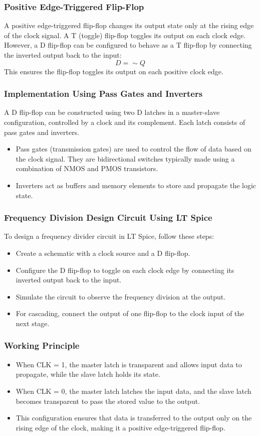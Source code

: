 \subsubsection*{Positive Edge-Triggered Flip-Flop}
A positive edge-triggered flip-flop changes its output state only at the rising edge of the clock signal. A T (toggle) flip-flop toggles its output on each clock edge. However, a D flip-flop can be configured to behave as a T flip-flop by connecting the inverted output back to the input:
\[
D = \sim Q
\]
This ensures the flip-flop toggles its output on each positive clock edge.
\subsubsection*{Implementation Using Pass Gates and Inverters}
A D flip-flop can be constructed using two D latches in a master-slave configuration, controlled by a clock and its complement. Each latch consists of pass gates and inverters.
\begin{itemize}
    \item Pass gates (transmission gates) are used to control the flow of data based on the clock signal. They are bidirectional switches typically made using a combination of NMOS and PMOS transistors.
    \item Inverters act as buffers and memory elements to store and propagate the logic state.
\end{itemize}
\subsubsection*{Frequency Division Design Circuit Using LT Spice}
To design a frequency divider circuit in LT Spice, follow these steps:
\begin{itemize}
    \item Create a schematic with a clock source and a D flip-flop.
    \item Configure the D flip-flop to toggle on each clock edge by connecting its inverted output back to the input.
    \item Simulate the circuit to observe the frequency division at the output.
    \item For cascading, connect the output of one flip-flop to the clock input of the next stage.
\end{itemize}
\subsubsection*{Working Principle}
\begin{itemize}
    \item When CLK = 1, the master latch is transparent and allows input data to propagate, while the slave latch holds its state.
    \item When CLK = 0, the master latch latches the input data, and the slave latch becomes transparent to pass the stored value to the output.
    \item This configuration ensures that data is transferred to the output only on the rising edge of the clock, making it a positive edge-triggered flip-flop.
\end{itemize}

